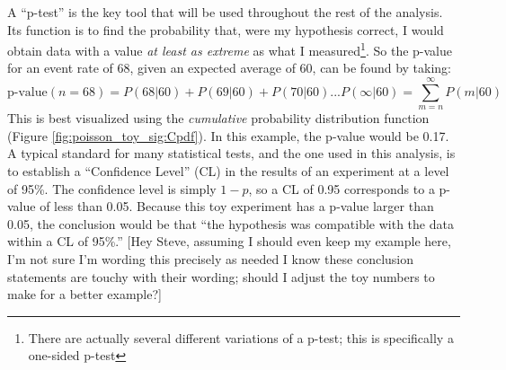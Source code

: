     \FloatBarrier
    A ``p-test'' is the key tool that will be used throughout the rest of the analysis.
    Its function is to find the probability that, were my hypothesis correct,
        I would obtain data with a value \textit{at least as extreme} as what I measured\footnote{
            There are actually several different variations of a p-test;
            this is specifically a one-sided p-test}.
    So the p-value for an event rate of 68, given an expected average of 60, can be found by taking:
    \begin{equation}
        \textrm{p-value}(n=68) = P(68|60) + P(69|60) + P(70|60) ... P(\infty|60) = \sum\limits_{m=n}^\infty P(m|60)
    \end{equation}
    This is best visualized using the \textit{cumulative} probability distribution function (Figure \ref{fig:poisson_toy_sig:Cpdf}).
    In this example, the p-value would be 0.17.
    A typical standard for many statistical tests, and the one used in this analysis,
        is to establish a ``Confidence Level'' (CL) in the results of an experiment at a level of 95\%. 
    The confidence level is simply $1-p$, so a CL of 0.95 corresponds to a p-value of less than 0.05.
    Because this toy experiment has a p-value larger than 0.05,
        the conclusion would be that ``the hypothesis was compatible with the data within a CL of 95\%.''
    [Hey Steve, assuming I should even keep my example here, I'm not sure I'm wording this precisely as needed 
        I know these conclusion statements are touchy with their wording;
        should I adjust the toy numbers to make for a better example?]


